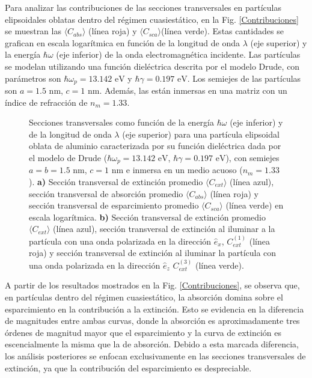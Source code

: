Para analizar las contribuciones de las secciones transversales en partículas elipsoidales oblatas dentro del régimen cuasiestático, en la Fig. \ref{Contribuciones} se muestran las $\langle C_{abs} \rangle$ (línea roja) y $\langle C_{sca} \rangle$(línea verde). Estas cantidades se grafican en escala logarítmica en función de la longitud de onda $\lambda$ (eje superior) y la energía $\hbar\omega$ (eje inferior) de la onda electromagnética incidente. Las partículas se modelan utilizando una función dieléctrica descrita por el modelo Drude, con parámetros son $\hbar\omega_p=13.142\text{ eV}$ y $\hbar\gamma=0.197\text{ eV}$. Los semiejes de las partículas son $a=1.5\text{ nm}$, $c=1\text{ nm}$. Además, las están inmersas en una matriz con un índice de refracción de $n_m=1.33$. \\
\begin{figure}[h!]
	\quad%
	\caption{Secciones transversales como función de la energía $\hbar\omega$ (eje inferior) y de la longitud de onda $\lambda$ (eje superior) para una partícula elipsoidal oblata de aluminio caracterizada por su función dieléctrica dada por el modelo de Drude ($\hbar\omega_p=13.142\text{ eV}$, $\hbar\gamma=0.197\text{ eV}$), con semiejes $a=b=1.5\text{ nm}$, $c=1\text{ nm}$ e inmersa en un medio acuoso ($n_m=1.33$). \textbf{a)}  Sección transversal de extinción promedio $\langle C_{ext}\rangle$  (línea azul), sección transversal de absorción promedio $\langle C_{abs}\rangle$  (línea roja) y sección transversal de esparcimiento promedio $\langle C_{sca}\rangle$  (línea verde) en escala logarítmica. \textbf{b)} Sección transversal de extinción promedio $\langle C_{ext}\rangle$ (línea azul), sección transversal de extinción al iluminar a la partícula con una onda polarizada en la dirección $\hat{e}_x$, $C_{ext}^{(1)}$  (línea roja)  y sección transversal de extinción al iluminar la partícula con una onda polarizada en la dirección $\hat{e}_z$ $C_{ext}^{(3)}$  (línea verde).} \label{fig:test}
\end{figure}

A partir de los resultados mostrados en la Fig. \ref{Contribuciones}, se observa que, en partículas dentro del régimen cuasiestático, la absorción domina sobre el esparcimiento en la contribución a la extinción. Esto se evidencia en la diferencia de magnitudes entre ambas curvas, donde la absorción es aproximadamente tres órdenes de magnitud mayor que el esparcimiento y la curva de extinción es escencialmente la misma que la de absorción. Debido a esta marcada diferencia, los análisis posteriores se enfocan exclusivamente en las secciones transversales de extinción, ya que la contribución del esparcimiento es despreciable.\\

